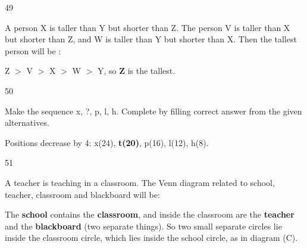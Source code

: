 \begin{question}{49}
{A person X is taller than Y but shorter than Z. The person V is taller than X but shorter than Z, and W is taller than Y but shorter than X. Then the tallest person will be :\par}
\begin{explain}
Z $>$ V $>$ X $>$ W $>$ Y, so \textbf{Z} is the tallest.
\end{explain}
\end{question}

\begin{question}{50}
{Make the sequence x, ?, p, l, h. Complete by filling correct answer from the given alternatives.\par}
\begin{explain}
Positions decrease by 4: x(24), \textbf{t(20)}, p(16), l(12), h(8).
\end{explain}
\end{question}

\begin{question}{51}
{A teacher is teaching in a classroom. The Venn diagram related to school, teacher, classroom and blackboard will be:\par}
\begin{explain}
The \textbf{school} contains the \textbf{classroom}, and inside the classroom are the \textbf{teacher} and the \textbf{blackboard} (two separate things). So two small separate circles lie inside the classroom circle, which lies inside the school circle, as in diagram (C).
\end{explain}
\end{question}

